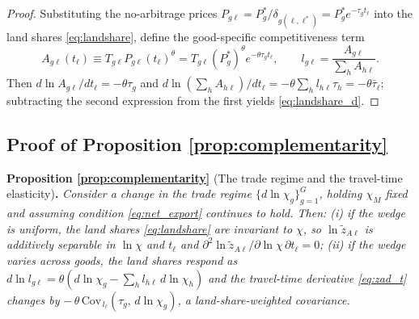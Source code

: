 \documentclass[11pt]{article}
\begin{document}
\begin{proof}
Substituting the no-arbitrage prices $P_{g\ell}=P_g^\ast/\delta_{g(\ell,\ell^*)}=P_g^\ast e^{-\tau_g t_\ell}$ into the land shares \eqref{eq:landshare}, define the good-specific competitiveness term
\[
A_{g\ell}(t_\ell)\equiv T_{g\ell}P_{g\ell}(t_\ell)^\theta
= T_{g\ell}(P_g^*)^\theta e^{-\theta\tau_g t_\ell},
\qquad
l_{g\ell}=\frac{A_{g\ell}}{\sum_h A_{h\ell}}.
\]
Then $d\ln A_{g\ell}/dt_\ell = -\theta\tau_g$ and $d \ln \left(\sum_h A_{h\ell}\right)/dt_\ell = -\theta\sum_h l_{h\ell}\tau_h = -\theta\bar{\tau}_\ell$; subtracting the second expression from the first yields \eqref{eq:landshare_d}.
\end{proof}

\subsection{Proof of Proposition \texorpdfstring{\ref{prop:complementarity}}{3}}
\label{app:proof_comp}

\noindent\textbf{Proposition \ref{prop:complementarity}} (The trade regime and the travel-time
elasticity)\textbf{.} \emph{Consider a change in the trade regime $\{d\ln\chi_g\}_{g=1}^G$,
holding $\chi_M$ fixed and assuming condition \eqref{eq:net_export} continues to hold. Then:
(i) if the wedge is uniform, the land shares \eqref{eq:landshare} are invariant to $\chi$, so
$\ln \tilde z_{A\ell}$ is additively separable in $\ln\chi$ and $t_\ell$ and
$\partial^2 \ln\tilde z_{A\ell}/\partial\ln\chi\,\partial t_\ell = 0$; (ii) if the wedge varies
across goods, the land shares respond as
$d \ln l_{g\ell} = \theta( d\ln\chi_g - \sum_{h} l_{h\ell}\, d\ln\chi_h )$ and the travel-time
derivative \eqref{eq:zad_t} changes by
$-\,\theta\,\mathrm{Cov}_{\,l_\ell}(\tau_g,\, d\ln\chi_g)$, a land-share-weighted
covariance.}\medskip
\end{document}

